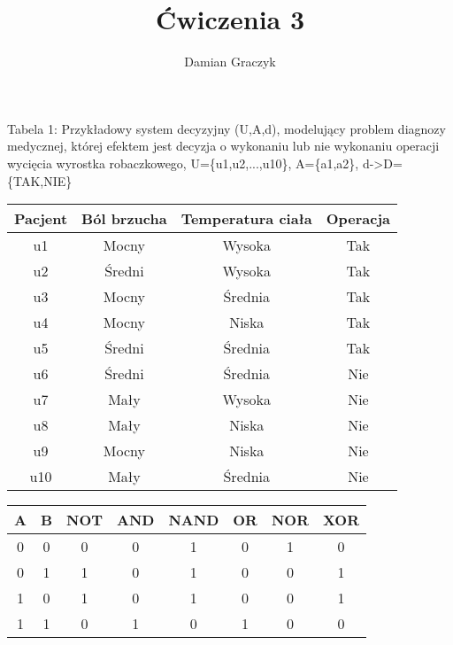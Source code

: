 \documentclass[a4paper]{article}
\begin{document}
\title{Ćwiczenia 3}
\author{Damian Graczyk}
\maketitle
\newpage
Tabela 1: Przykładowy system decyzyjny (U,A,d), modelujący problem diagnozy medycznej, której efektem jest decyzja o wykonaniu lub nie wykonaniu operacji wycięcia wyrostka robaczkowego, U=\{u1,u2,...,u10\}, A=\{a1,a2\}, d->D=\{TAK,NIE\}
\begin {center}
\begin {tabular} {c | c c c}
\hline
\hline
 Pacjent & Ból brzucha & Temperatura ciała & Operacja \\
 \hline
 u1 & Mocny & Wysoka & Tak \\
 u2 & Średni & Wysoka & Tak \\
 u3 & Mocny & Średnia & Tak \\
 u4 & Mocny & Niska & Tak \\
 u5 & Średni & Średnia & Tak \\
 u6 & Średni & Średnia & Nie \\
 u7 & Mały & Wysoka & Nie \\
 u8 & Mały & Niska & Nie \\
 u9 & Mocny & Niska & Nie \\
 u10 & Mały & Średnia & Nie \\
 \hline
 \hline
\end {tabular}
\end {center}
\newpage
\begin{center}
\begin{tabular} { c c | c c c c c c}
 A & B & NOT & AND & NAND & OR & NOR & XOR \\
 \hline
 0 & 0 & 0 & 0 & 1 & 0 & 1 & 0 \\
 0 & 1 & 1 & 0 & 1 & 0 & 0 & 1 \\
 1 & 0 & 1 & 0 & 1 & 0 & 0 & 1 \\
 1 & 1 & 0 & 1 & 0 & 1 & 0 & 0
\end{tabular}
\end{center}
\end{document}
